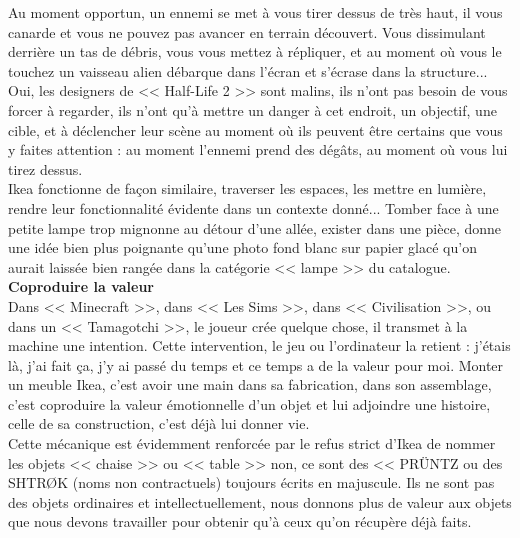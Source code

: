 \documentclass[11pt,twoside,a4paper]{article}
\begin{document}
Au moment opportun, un ennemi se met {\`a} vous tirer dessus de tr{\`e}s haut, il vous canarde et vous ne pouvez pas avancer en terrain d{\'e}couvert. Vous dissimulant derri{\`e}re un tas de d{\'e}bris, vous vous mettez {\`a} r{\'e}pliquer, et au moment o{\`u} vous le touchez un vaisseau alien d{\'e}barque dans l'{\'e}cran et s'{\'e}crase dans la structure...~\\

Oui, les designers de << Half-Life 2 >> sont malins, ils n'ont pas besoin de vous forcer {\`a} regarder, ils n'ont qu'{\`a} mettre un danger {\`a} cet endroit, un objectif, une cible, et {\`a} d{\'e}clencher leur sc{\`e}ne au moment o{\`u} ils peuvent {\^e}tre certains que vous y faites attention : au moment l'ennemi prend des d{\'e}g{\^a}ts, au moment o{\`u} vous lui tirez dessus.~\\

Ikea fonctionne de fa\c{c}on similaire, traverser les espaces, les mettre en lumi{\`e}re, rendre leur fonctionnalit{\'e} {\'e}vidente dans un contexte donn{\'e}... Tomber face {\`a} une petite lampe trop mignonne au d{\'e}tour d'une all{\'e}e, exister dans une pi{\`e}ce, donne une id{\'e}e bien plus poignante qu'une photo fond blanc sur papier glac{\'e} qu'on aurait laiss{\'e}e bien rang{\'e}e dans la cat{\'e}gorie << lampe >> du catalogue.~\\

\textbf{\large Coproduire la valeur}~\\

Dans << Minecraft >>, dans << Les Sims >>, dans << Civilisation >>, ou dans un << Tamagotchi >>, le joueur cr{\'e}e quelque chose, il transmet {\`a} la machine une intention. Cette intervention, le jeu ou l'ordinateur la retient : j'{\'e}tais l{\`a}, j'ai fait \c{c}a, j'y ai pass{\'e} du temps et ce temps a de la valeur pour moi. Monter un meuble Ikea, c'est avoir une main dans sa fabrication, dans son assemblage, c'est coproduire la valeur {\'e}motionnelle d'un objet et lui adjoindre une histoire, celle de sa construction, c'est d{\'e}j{\`a} lui donner vie.~\\

Cette m{\'e}canique est {\'e}videmment renforc{\'e}e par le refus strict d'Ikea de nommer les objets << chaise >> ou << table >> non, ce sont des << PR{\"U}NTZ ou des SHTR\O K (noms non contractuels) toujours {\'e}crits en majuscule. Ils ne sont pas des objets ordinaires et intellectuellement, nous donnons plus de valeur aux objets que nous devons travailler pour obtenir qu'{\`a} ceux qu'on r{\'e}cup{\`e}re d{\'e}j{\`a} faits.~\\
\end{document}
